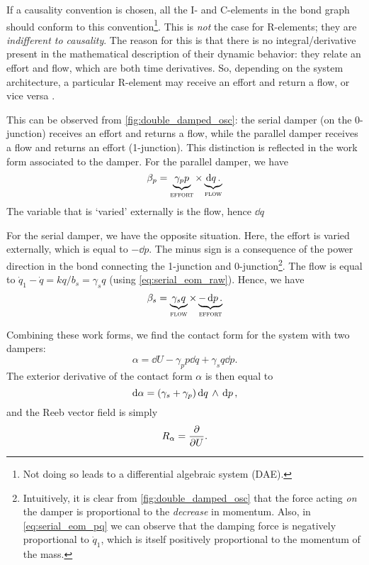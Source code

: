 If a causality convention is chosen, all the I- and C-elements in the bond graph should conform to this convention\footnote{Not doing so leads to a differential algebraic system (DAE).}. This is \emph{not} the case for R-elements; they are \emph{indifferent to causality}. The reason for this is that there is no integral/derivative present in the mathematical description of their dynamic behavior: they relate an effort and flow, which are both time derivatives. So, depending on the system architecture, a particular R-element may receive an effort and return a flow, or vice versa \cite{Borutzky2010}.

This can be observed from \cref{fig:double_damped_osc}: the serial damper (on the 0-junction) receives an effort and returns a flow, while the parallel damper receives a flow and returns an effort (1-junction). This distinction is reflected in the work form associated to the damper. For the parallel damper, we have
$$ \beta_p = \underbrace{\gamma_p p}_\text{\textsc{effort}} \times \underbrace{\dd{q}.}_\text{\textsc{flow}} $$
The variable that is `varied' externally is the flow, hence $\dd{q}$ 

For the serial damper, we have the opposite situation. Here, the effort is varied externally, which is equal to $-\dd{p}$. The minus sign is a consequence of the power direction in the bond connecting the 1-junction and 0-junction\footnote{Intuitively, it is clear from \cref{fig:double_damped_osc} that the force acting \emph{on} the damper is proportional to the \emph{decrease} in momentum. Also, in \cref{eq:serial_eom_pq} we can observe that the damping force is negatively proportional to $\dot{q}_1$, which is itself positively proportional to the momentum of the mass.}. The flow is equal to $\dot{q}_1 - \dot{q} = kq/b_s = \gamma_s q$ (using \cref{eq:serial_eom_raw}). Hence, we have
$$ \beta_s = \underbrace{\gamma_s q}_\text{\textsc{flow}} \times \underbrace{-\dd{p}.}_\text{\textsc{effort}}$$

Combining these work forms, we find the contact form for the system with two dampers:
\begin{equation}
    \alpha = \dd{U} - \gamma_p p\dd{q} + \gamma_s q \dd{p}.
    \label{eq:serial_dho_contact_form}
\end{equation}
The exterior derivative of the contact form $\alpha$ is then equal to
$$ \dd{\alpha} = (\gamma_s + \gamma_p)  \dd{q}\,\wedge\,\dd{p} , $$
and the Reeb vector field is simply
$$ R_\alpha = \pdv{}{U}. $$

